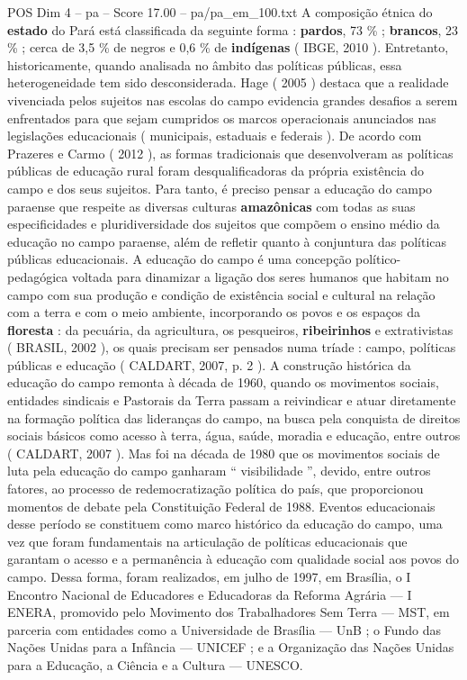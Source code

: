 \begin{textsample}{POS Dim 4 – pa – Score 17.00 – pa/pa\_em\_100.txt}
A composição étnica do \textbf{estado} do Pará está classificada da seguinte forma : \textbf{pardos}, 73 \% ; \textbf{brancos}, 23 \% ; cerca de 3,5 \% de negros e 0,6 \% de \textbf{indígenas} ( IBGE, 2010 ).
Entretanto, historicamente, quando analisada no âmbito das políticas públicas, essa heterogeneidade tem sido desconsiderada.
Hage ( 2005 ) destaca que a realidade vivenciada pelos sujeitos nas escolas do campo evidencia grandes desafios a serem enfrentados para que sejam cumpridos os marcos operacionais anunciados nas legislações educacionais ( municipais, estaduais e federais ).
De acordo com Prazeres e Carmo ( 2012 ), as formas tradicionais que desenvolveram as políticas públicas de educação rural foram desqualificadoras da própria existência do campo e dos seus sujeitos.
Para tanto, é preciso pensar a educação do campo paraense que respeite as diversas culturas \textbf{amazônicas} com todas as suas especificidades e pluridiversidade dos sujeitos que compõem o ensino médio da educação no campo paraense, além de refletir quanto à conjuntura das políticas públicas educacionais.
A educação do campo é uma concepção político-pedagógica voltada para dinamizar a ligação dos seres humanos que habitam no campo com sua produção e condição de existência social e cultural na relação com a terra e com o meio ambiente, incorporando os povos e os espaços da \textbf{floresta} : da pecuária, da agricultura, os pesqueiros, \textbf{ribeirinhos} e extrativistas ( BRASIL, 2002 ), os quais precisam ser pensados numa tríade : campo, políticas públicas e educação ( CALDART, 2007, p. 2 ).
A construção histórica da educação do campo remonta à década de 1960, quando os movimentos sociais, entidades sindicais e Pastorais da Terra passam a reivindicar e atuar diretamente na formação política das lideranças do campo, na busca pela conquista de direitos sociais básicos como acesso à terra, água, saúde, moradia e educação, entre outros ( CALDART, 2007 ).
Mas foi na década de 1980 que os movimentos sociais de luta pela educação do campo ganharam “ visibilidade ”, devido, entre outros fatores, ao processo de redemocratização política do país, que proporcionou momentos de debate pela Constituição Federal de 1988.
Eventos educacionais desse período se constituem como marco histórico da educação do campo, uma vez que foram fundamentais na articulação de políticas educacionais que garantam o acesso e a permanência à educação com qualidade social aos povos do campo.
Dessa forma, foram realizados, em julho de 1997, em Brasília, o I Encontro Nacional de Educadores e Educadoras da Reforma Agrária — I ENERA, promovido pelo Movimento dos Trabalhadores Sem Terra — MST, em parceria com entidades como a Universidade de Brasília — UnB ; o Fundo das Nações Unidas para a Infância — UNICEF ; e a Organização das Nações Unidas para a Educação, a Ciência e a Cultura — UNESCO.

\end{textsample}
